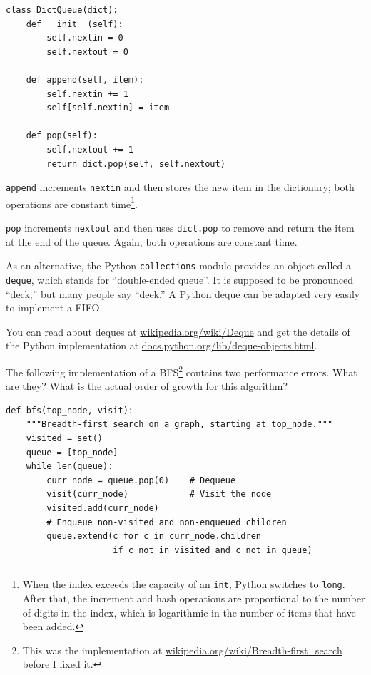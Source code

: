 \documentclass[10pt]{book}
\begin{document}
\begin{verbatim}
class DictQueue(dict):
    def __init__(self):
        self.nextin = 0
        self.nextout = 0

    def append(self, item):
        self.nextin += 1
        self[self.nextin] = item

    def pop(self):
        self.nextout += 1
        return dict.pop(self, self.nextout)
\end{verbatim}

{\tt append} increments {\tt nextin} and then stores the new item
in the dictionary; both operations are constant time\footnote{
When the index exceeds the capacity of an {\tt int}, Python
switches to {\tt long}.  After that, the increment and hash operations
are proportional to the number of digits in the index, which is
logarithmic in the number of items that have been added.}.

{\tt pop} increments {\tt nextout} and then uses {\tt dict.pop}
to remove and return the item at the end of the queue.  Again,
both operations are constant time.

As an alternative,
the Python {\tt collections} module provides an object called a {\tt
  deque}, which stands for ``double-ended queue''.  It is supposed to
be pronounced ``deck,'' but many people say ``deek.''  A Python deque
can be adapted very easily to implement a FIFO.

You can read about deques at \url{wikipedia.org/wiki/Deque}
and get the details of the Python implementation at
\url{docs.python.org/lib/deque-objects.html}.


\begin{ex}

The following implementation of a BFS\footnote{This was the
  implementation at \url{wikipedia.org/wiki/Breadth-first_search}
  before I fixed it.}  contains two performance errors.  What are
they?  What is the actual order of growth for this algorithm?

\begin{verbatim}
def bfs(top_node, visit):
    """Breadth-first search on a graph, starting at top_node."""
    visited = set()
    queue = [top_node]
    while len(queue):
        curr_node = queue.pop(0)    # Dequeue
        visit(curr_node)            # Visit the node
        visited.add(curr_node)
        # Enqueue non-visited and non-enqueued children
        queue.extend(c for c in curr_node.children
                     if c not in visited and c not in queue)
\end{verbatim}

\end{ex}
\end{document}
